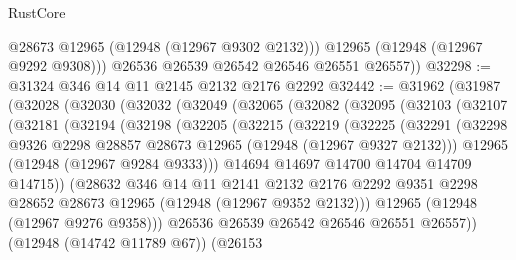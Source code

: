 \begin{lexlean}{RustCore}
\begin{coremodule}
            @28673
            @12965
            (@12948 (@12967 @9302 @2132)))
          @12965
          (@12948 (@12967 @9292 @9308)))
        @26536
        @26539
        @26542
        @26546
        @26551
        @26557))
@32298 := @31324 @346 @14 @11 @2145 @2132 @2176 @2292
@32442 := @31962
    (@31987
      (@32028
        (@32030
          (@32032
            (@32049
              (@32065
                (@32082
                  (@32095
                    (@32103
                      (@32107
                        (@32181
                          (@32194
                            (@32198
                              (@32205
                                (@32215
                                  (@32219
                                    (@32225
                                      (@32291
                                        (@32298
                                          @9326
                                          @2298
                                          @28857
                                          @28673
                                          @12965
                                          (@12948 (@12967 @9327 @2132)))
                                        @12965
                                        (@12948 (@12967 @9284 @9333)))
                                      @14694
                                      @14697
                                      @14700
                                      @14704
                                      @14709
                                      @14715))
                                  (@28632
                                    @346
                                    @14
                                    @11
                                    @2141
                                    @2132
                                    @2176
                                    @2292
                                    @9351
                                    @2298
                                    @28652
                                    @28673
                                    @12965
                                    (@12948 (@12967 @9352 @2132)))
                                  @12965
                                  (@12948 (@12967 @9276 @9358)))
                                @26536
                                @26539
                                @26542
                                @26546
                                @26551
                                @26557))
                            (@12948 (@14742 @11789 @67))
                            (@26153

\end{coremodule}
\end{lexlean}
